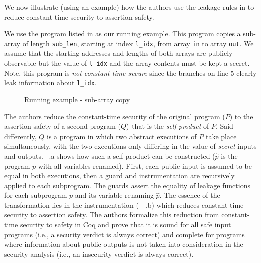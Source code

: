 
We now illustrate (using an example) how the authors use the leakage rules in  
to reduce constant-time security to assertion safety.

We use the program listed in  as our running example. 
This program copies a sub-array of length \texttt{sub\_len}, starting at index \texttt{l\_idx}, from array \texttt{in}
to array \texttt{out}.
We assume that the starting addresses and lengths of both arrays are publicly observable but the value of \texttt{l\_idx} and the array contents must be kept a secret.
Note, this program is \emph{not constant-time secure} since the branches on line 5 clearly leak information about \texttt{l\_idx}.

\begin{figure}[h]
    \centering\resizebox{0.7\columnwidth}{!}{}
    \caption{Running example - sub-array copy}
    \label{fig:example}
\end{figure}


The authors reduce the constant-time security of the original program ($P$) to the assertion safety of a second program ($Q$) that is the \emph{self-product} of $P$.
Said differently, $Q$ is a program in which two abstract executions of $P$ take place simultaneously, with the two executions only differing in the value of \emph{secret} inputs and outputs. 
~.a shows how such a self-product can be constructed ($\hat{p}$ is the program $p$ with all variables renamed).
First, each public input is assumed to be equal in both executions, then a guard and instrumentation are recursively applied to each subprogram. 
The guards assert the equality of leakage functions for each subprogram $p$ and its variable-renaming $\hat{p}$.
The essence of the transformation lies in the instrumentation (~~.b) which reduces constant-time security to assertion safety. 
The authors formalize this reduction from constant-time security to safety in Coq and prove that it is sound for all safe input programs (i.e., a security verdict is always correct) and complete for programs where information about public outputs is not taken into consideration in the security analysis (i.e., an insecurity verdict is always correct).

